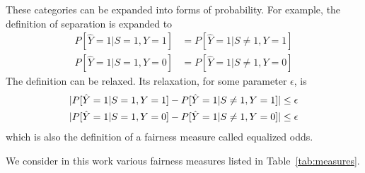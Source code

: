 \documentclass[manuscript,screen,review,anonymous]{acmart}
\DeclarePairedDelimiter{\abs}{\lvert}{\rvert}
\begin{document}
These categories can be expanded into forms of probability. For example, the definition of separation is expanded to
\begin{align*}
P[\hat{Y} = 1 | S = 1, Y = 1] & = P[\hat{Y} = 1 | S \neq 1, Y = 1] \\
P[\hat{Y} = 1 | S = 1, Y = 0] & = P[\hat{Y} = 1 | S \neq 1, Y = 0]
\end{align*}
The definition can be relaxed. Its relaxation, for some parameter $\epsilon$, is
\begin{align*}
\abs{P[\hat{Y} = 1 | S = 1, Y = 1] - P[\hat{Y} = 1 | S \neq 1, Y = 1]} & \leq \epsilon \\
\abs{P[\hat{Y} = 1 | S = 1, Y = 0] - P[\hat{Y} = 1 | S \neq 1, Y = 0]} & \leq \epsilon
\end{align*}
which is also the definition of a fairness measure called equalized odds.

We consider in this work various fairness measures listed in Table~\ref{tab:measures}.
\end{document}
